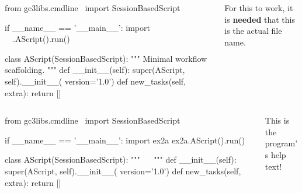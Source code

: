 \documentclass[english,serif,mathserif,xcolor=pdftex,dvipsnames,table]{beamer}
\begin{document}
\begin{frame}[fragile]
  \begin{columns}[t]
    \begin{column}{0.7\linewidth}
\begin{python}
from gc3libs.cmdline \
  import SessionBasedScript

if __name__ == '__main__':
  import ~~
  ~\HL{ex2a}~.AScript().run()

class AScript(SessionBasedScript):
  """
  Minimal workflow scaffolding.
  """
  def __init__(self):
    super(AScript, self).__init__(
        version='1.0')
  def new_tasks(self, extra):
    return []
\end{python}
    \end{column}
    \begin{column}{0.4\linewidth}
      \begin{flushright}
        For this to work, it is \textbf{needed} that this is the
        actual file name.
      \end{flushright}
    \end{column}
  \end{columns}
\end{frame}


\begin{frame}[fragile]
  \begin{columns}
    \begin{column}{0.7\linewidth}
\begin{python}
from gc3libs.cmdline \
  import SessionBasedScript

if __name__ == '__main__':
  import ex2a
  ex2a.AScript().run()

class AScript(SessionBasedScript):
  """
  ~~
  """
  def __init__(self):
    super(AScript, self).__init__(
        version='1.0')
  def new_tasks(self, extra):
    return []
\end{python}
    \end{column}
    \begin{column}{0.4\linewidth}
      \begin{flushright}
        This is the \\ program's help text!
      \end{flushright}
    \end{column}
  \end{columns}
\end{frame}
\end{document}
